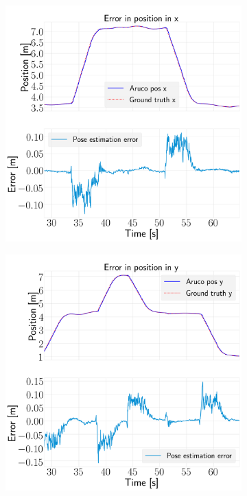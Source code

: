 \documentclass[../Head/report.tex]{subfiles}
\begin{document}
\begin{figure}[H]
    \centering
    \begin{subfigure}[t]{.30\textwidth}
        \centering
        \includegraphics[width=\textwidth]{../Figures/vision_navigation/test1_full_pattern_board/error_x/pose_error_x_test1.png}
        \caption{}
        \label{fig:vision_navigation_error_x}
    \end{subfigure}
     \hspace{0.2em}
    \begin{subfigure}[t]{.30\textwidth}
        \centering
        \includegraphics[width=\textwidth]{../Figures/vision_navigation/test1_full_pattern_board/error_y/pose_error_y_test1.png}

\end{subfigure}
\end{figure}
\end{document}
